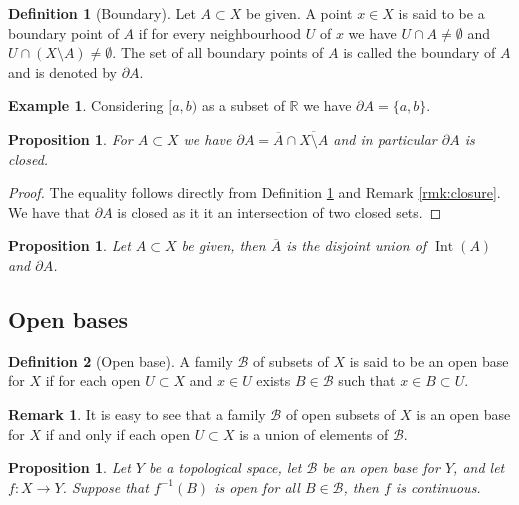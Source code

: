 \documentclass[11pt,a4paper]{article}
\theoremstyle{definition}
\newtheorem{definition}{Definition}[section]
\newtheorem{remark}{Remark}[section]
\newtheorem{example}{Example}[section]
\theoremstyle{plain}
\newtheorem{proposition}[theorem]{Proposition}
\DeclareMathOperator{\Int}{Int}
\newcommand{\R}{\mathbb{R}}
\begin{document}
  \begin{definition}[Boundary]\label{dfn:boundary}
    Let $A \subset X$ be given. A point $x \in X$ is said to be a boundary
    point of $A$ if for every neighbourhood $U$ of $x$ we have 
    $U \cap A \neq \emptyset$ and $U \cap (X \setminus A) \neq \emptyset$.
    The set of all boundary points of $A$ is called the boundary of $A$ and 
    is denoted by $\partial A$.
  \end{definition}

  \begin{example}
    Considering $[a,b)$ as a subset of $\R$ we have $\partial A = \{a,b\}$.
  \end{example}

  \begin{proposition}
    For $A \subset X$ we have 
    $\partial A = \overline{A} \cap \overline{X \setminus A}$ and in 
    particular $\partial A$ is closed.
  \end{proposition}
  \begin{proof}
    The equality follows directly from Definition \ref{dfn:boundary} and
    Remark \ref{rmk:closure}. We have that $\partial A$ is closed as it
    it an intersection of two closed sets.
  \end{proof}

  \begin{proposition}
    Let $A \subset X$ be given, then $\overline A$ is the disjoint union of 
    $\Int(A)$ and $\partial A$.
  \end{proposition}
  
  \subsection{Open bases}

  \begin{definition}[Open base]
    A family $\mathcal{B}$ of subsets of $X$ is said to be an open base
    for $X$ if for each open $U \subset X$ and $x \in U$ exists 
    $B \in \mathcal{B}$ such that $x \in B \subset U$.
  \end{definition}

  \begin{remark}
    It is easy to see that a family $\mathcal{B}$ of open subsets of $X$ is an 
    open base for $X$ if and only if each open $U \subset X$ is a union of 
    elements of $\mathcal{B}$.
  \end{remark}

  \begin{proposition}\label{prp:base-continuity}
    Let $Y$ be a topological space, let $\mathcal B$ be an open base for $Y$, 
    and let $f \colon X \to Y$. 
    Suppose that $f^{-1}(B)$ is open for all $B \in \mathcal B$,
    then $f$ is continuous.
  \end{proposition}
\end{document}
